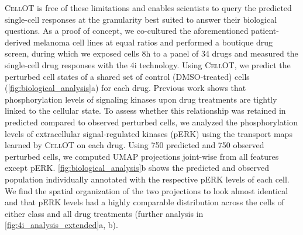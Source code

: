 \textsc{CellOT} is free of these limitations and enables scientists to query the predicted single-cell responses at the granularity best suited to answer their biological questions. As a proof of concept, we co-cultured the aforementioned patient-derived melanoma cell lines at equal ratios and performed a boutique drug screen, during which we exposed cells 8h to a panel of 34 drugs and measured the single-cell drug responses with the 4i technology. 
Using \textsc{CellOT}, 
we predict the perturbed cell states of a shared set of control (DMSO-treated) cells (\cref{fig:biological_analysis}a) for each drug.
Previous work \citep{kramer2019cellular} shows that phosphorylation levels of signaling kinases upon drug treatments are tightly linked to the cellular state. 
To assess whether this relationship was retained in predicted compared to observed perturbed cells, we analyzed the phosphorylation levels of extracellular signal-regulated kinases (pERK) using the transport maps learned by \textsc{CellOT} on each drug.
Using 750 predicted and 750 observed perturbed cells, we computed UMAP projections joint-wise from all features except pERK. \cref{fig:biological_analysis}b shows the predicted and observed population individually annotated with the respective pERK levels of each cell. We find the spatial organization of the two projections to look almost identical and that pERK levels had a highly comparable distribution across the cells of either class and all drug treatments (further analysis in \cref{fig:4i_analysis_extended}a, b).


